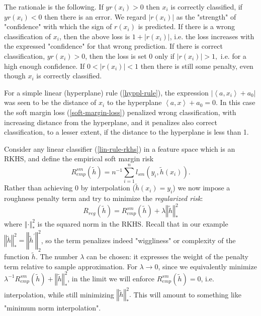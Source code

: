 \documentclass[11pt,twoside]{article}%
\theoremstyle{change}
\begin{document}
The rationale is the following. If $yr(x_{i})>0$ then $x_{i}$ is correctly
classified, if $yr(x_{i})<0$ then there is an error. We regard $\left\vert
r(x_{i})\right\vert $ as the "strength" of "confidence" with which the sign of
$r(x_{i})$ is predicted. If there is a wrong classification of $x_{i}$, then
the above loss is $1+\left\vert r(x_{i})\right\vert $, i.e. the loss increases
with the expressed "confidence" for that wrong prediction. If there is correct
classification, $yr(x_{i})>0$, then the loss is set $0$ only if $\left\vert
r(x_{i})\right\vert >1,$ i.e. for a high enough confidence. If $0<\left\vert
r(x_{i})\right\vert <1$ then there is still some penalty, even though $x_{i}$
is correctly classified.

For a simple linear (hyperplane) rule (\ref{hyppl-rule}), the expression
$\left\vert \left\langle a,x_{i}\right\rangle +a_{0}\right\vert $ was seen to
be the distance of $x_{i}$ to the hyperplane $\left\langle a,x\right\rangle
+a_{0}=0$. In this case the soft margin loss (\ref{soft-margin-loss})
penalized wrong classification, with increasing distance from the hyperplane,
and it penalizes also correct classification, to a lesser extent, if the
distance to the hyperplane is less than 1.

Consider any linear classifier (\ref{lin-rule-rkhs}) in a feature space which
is an RKHS, and define the empirical soft margin risk
\[
R_{emp}^{sm}(\tilde{h})=n^{-1}\sum_{i=1}^{n}l_{sm}(y_{i},\tilde{h}(x_{i})).
\]
Rather than achieving $0$ by interpolation ($\tilde{h}(x_{i})=y_{i}$) we now
impose a roughness penalty term and try to minimize the \textit{regularized
risk}:
\begin{equation}
R_{reg}(\tilde{h})=R_{emp}^{sm}(\tilde{h})+\lambda\left\Vert \tilde
{h}\right\Vert _{\ast}^{2}\label{regul-risk}%
\end{equation}
where $\left\Vert \cdot\right\Vert _{\ast}^{2}$ is the squared norm in the
RKHS. Recall that in our example $\left\Vert \tilde{h}\right\Vert _{\ast}%
^{2}=\left\Vert \tilde{h}^{\prime}\right\Vert _{2}^{2}$, so the term penalizes
indeed "wiggliness" or complexity of the function $\tilde{h}$. The number
$\lambda$ can be chosen: it expresses the weight of the penalty term relative
to sample approximation. For $\lambda\rightarrow0$, since we equivalently
minimize $\lambda^{-1}R_{emp}^{sm}(\tilde{h})+\left\Vert \tilde{h}\right\Vert
_{\ast}^{2}$, in the limit we will enforce $R_{emp}^{sm}(\tilde{h})=0$, i.e.
interpolation, while still minimizing $\left\Vert \tilde{h}\right\Vert _{\ast
}^{2}.$ This will amount to something like "minimum norm interpolation".
\end{document}

